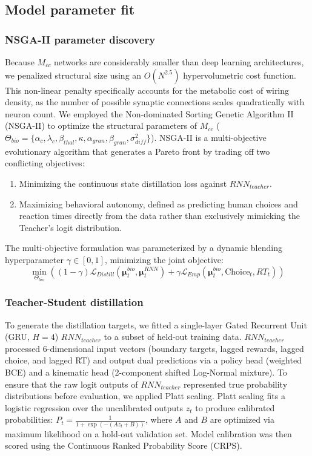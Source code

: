 \documentclass[12pt, a4paper]{extarticle}
\begin{document}
\subsection{Model parameter fit}

\subsubsection{NSGA-II parameter discovery}
Because $M_{cc}$ networks are considerably smaller than deep learning architectures, we penalized structural size using an $O(N^{2.5})$ hypervolumetric cost function. This non-linear penalty specifically accounts for the metabolic cost of wiring density, as the number of possible synaptic connections scales quadratically with neuron count. We employed the Non-dominated Sorting Genetic Algorithm II (NSGA-II) \parencite{deb2002fast} to optimize the structural parameters of $M_{cc}$ ($\Theta_{bio} = \{\alpha_c, \lambda_c, \beta_{thal}, \kappa, \alpha_{gran}, \beta_{gran}, \sigma_{diff}^2\}$). NSGA-II is a multi-objective evolutionary algorithm that generates a Pareto front by trading off two conflicting objectives:
\begin{enumerate}
	\item Minimizing the continuous state distillation loss against $RNN_{teacher}$.
	\item Maximizing behavioral autonomy, defined as predicting human choices and reaction times directly from the data rather than exclusively mimicking the Teacher's logit distribution.
\end{enumerate}
The multi-objective formulation was parameterized by a dynamic blending hyperparameter $\gamma \in [0, 1]$, minimizing the joint objective:
\begin{equation}
	\min_{\Theta_{bio}} \left( (1-\gamma)\mathcal{L}_{Distill}(\boldsymbol{\mu}_t^{bio}, \boldsymbol{\mu}_t^{RNN}) + \gamma \mathcal{L}_{Emp}(\boldsymbol{\mu}_t^{bio}, \text{Choice}_t, RT_t) \right)
\end{equation}

\subsubsection{Teacher-Student distillation}
To generate the distillation targets, we fitted a single-layer Gated Recurrent Unit (GRU, $H=4$) $RNN_{teacher}$ to a subset of held-out training data. $RNN_{teacher}$ processed 6-dimensional input vectors (boundary targets, lagged rewards, lagged choice, and lagged RT) and output dual predictions via a policy head (weighted BCE) and a kinematic head (2-component shifted Log-Normal mixture). To ensure that the raw logit outputs of $RNN_{teacher}$ represented true probability distributions before evaluation, we applied Platt scaling. Platt scaling fits a logistic regression over the uncalibrated outputs $z_t$ to produce calibrated probabilities: $P_t = \frac{1}{1 + \exp(-(A z_t + B))}$, where $A$ and $B$ are optimized via maximum likelihood on a hold-out validation set. Model calibration was then scored using the Continuous Ranked Probability Score (CRPS).
\end{document}
